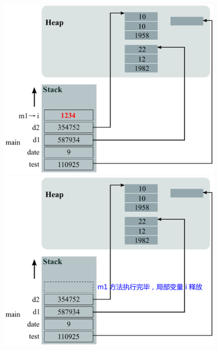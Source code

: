 \begin{figure}[htb]
  \begin{minipage}[t]{0.5\linewidth}
    \centering
    \includegraphics[width=\textwidth]{images/Java-memory-allocation/fig03.pdf}
  \end{minipage}%
  \begin{minipage}[t]{0.5\linewidth}
    \centering
    \includegraphics[width=\textwidth]{images/Java-memory-allocation/fig04.pdf}
  \end{minipage}
\end{figure}

